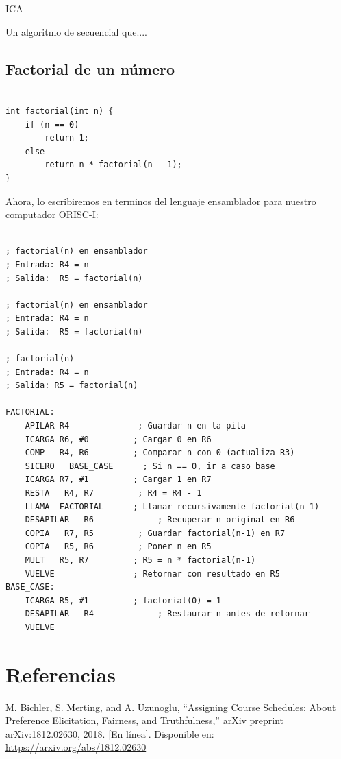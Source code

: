 ICA\documentclass{article}
\begin{document}
Un algoritmo de secuencial que....

\subsection{Factorial de un número}
\begin{verbatim}

int factorial(int n) {
    if (n == 0)
        return 1;
    else
        return n * factorial(n - 1);
}
\end{verbatim}
Ahora, lo escribiremos en terminos del lenguaje ensamblador para nuestro computador ORISC-I:

\begin{verbatim}

; factorial(n) en ensamblador
; Entrada: R4 = n
; Salida:  R5 = factorial(n)

; factorial(n) en ensamblador
; Entrada: R4 = n
; Salida:  R5 = factorial(n)

; factorial(n)
; Entrada: R4 = n
; Salida: R5 = factorial(n)

FACTORIAL:
    APILAR R4              ; Guardar n en la pila
    ICARGA R6, #0         ; Cargar 0 en R6
    COMP   R4, R6         ; Comparar n con 0 (actualiza R3)
    SICERO   BASE_CASE      ; Si n == 0, ir a caso base
    ICARGA R7, #1         ; Cargar 1 en R7
    RESTA   R4, R7         ; R4 = R4 - 1
    LLAMA  FACTORIAL      ; Llamar recursivamente factorial(n-1)
    DESAPILAR   R6             ; Recuperar n original en R6
    COPIA   R7, R5         ; Guardar factorial(n-1) en R7
    COPIA   R5, R6         ; Poner n en R5
    MULT   R5, R7         ; R5 = n * factorial(n-1)
    VUELVE                ; Retornar con resultado en R5
BASE_CASE:
    ICARGA R5, #1         ; factorial(0) = 1
    DESAPILAR   R4             ; Restaurar n antes de retornar
    VUELVE

\end{verbatim}





\section{Referencias}
\renewcommand{\refname}{}

\begin{thebibliography}{9}

   \label{ref:BPS} M. Bichler, S. Merting, and A. Uzunoglu,
  “Assigning Course Schedules: About Preference Elicitation, Fairness, and Truthfulness,”
  arXiv preprint arXiv:1812.02630, 2018. [En línea]. Disponible en:
  \url{https://arxiv.org/abs/1812.02630}


\end{thebibliography}
\end{document}
